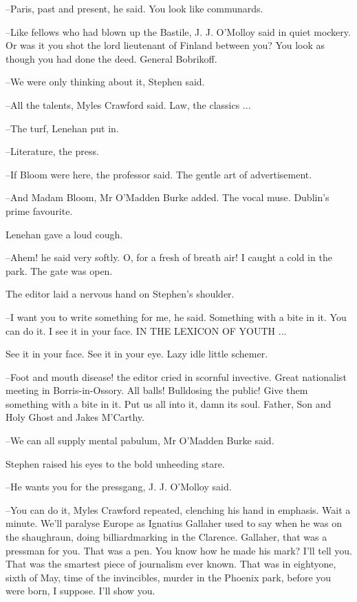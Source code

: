 --Paris, past and present, he said. You look like communards.

--Like fellows who had blown up the Bastile, J. J. O'Molloy said in quiet
mockery. Or was it you shot the lord lieutenant of Finland between you?
You look as though you had done the deed. General Bobrikoff.



--We were only thinking about it, Stephen said.

--All the talents, Myles Crawford said. Law, the classics ...

--The turf, Lenehan put in.

--Literature, the press.

--If Bloom were here, the professor said. The gentle art of advertisement.

--And Madam Bloom, Mr O'Madden Burke added. The vocal muse. Dublin's
prime favourite.

 Lenehan gave a loud cough.

--Ahem! he said very softly. O, for a fresh of breath air! I caught a
cold in the park. The gate was open.



The editor laid a nervous hand on Stephen's shoulder.

--I want you to write something for me, he said. Something with a bite in
it. You can do it. I see it in your face. IN THE LEXICON OF YOUTH ...

See it in your face. See it in your eye. Lazy idle little schemer.

--Foot and mouth disease! the editor cried in scornful invective. Great
nationalist meeting in Borris-in-Ossory. All balls! Bulldosing the public!
Give them something with a bite in it. Put us all into it, damn its soul.
Father, Son and Holy Ghost and Jakes M'Carthy.

--We can all supply mental pabulum, Mr O'Madden Burke said.

Stephen raised his eyes to the bold unheeding stare.

--He wants you for the pressgang, J. J. O'Molloy said.



--You can do it, Myles Crawford repeated, clenching his hand in emphasis.
Wait a minute. We'll paralyse Europe as Ignatius Gallaher used to say when
he was on the shaughraun, doing billiardmarking in the Clarence. Gallaher,
that was a pressman for you. That was a pen. You know how he made his
mark? I'll tell you. That was the smartest piece of journalism ever known.
That was in eightyone, sixth of May, time of the invincibles, murder in
the Phoenix park, before you were born, I suppose. I'll show you.

